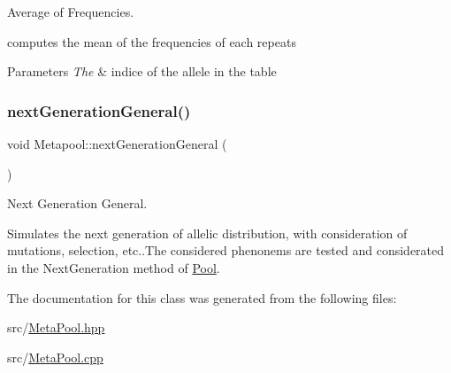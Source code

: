 Average of Frequencies. 

computes the mean of the frequencies of each repeats 
\begin{DoxyParams}{Parameters}
{\em The} & indice of the allele in the table \\
\hline
\end{DoxyParams}
\hypertarget{class_metapool_aff52cdb3a0fbdca26b966213aaf3577b}{}\label{class_metapool_aff52cdb3a0fbdca26b966213aaf3577b} 
\subsubsection{\texorpdfstring{next\+Generation\+General()}{nextGenerationGeneral()}}
{\footnotesize\ttfamily void Metapool\+::next\+Generation\+General (\begin{DoxyParamCaption}{ }\end{DoxyParamCaption})}



Next Generation General. 

Simulates the next generation of allelic distribution, with consideration of mutations, selection, etc..The considered phenonems are tested and considerated in the Next\+Generation method of \hyperlink{class_pool}{Pool}. 

The documentation for this class was generated from the following files\+:\begin{DoxyCompactItemize}
\item 
src/\hyperlink{_meta_pool_8hpp}{Meta\+Pool.\+hpp}\item 
src/\hyperlink{_meta_pool_8cpp}{Meta\+Pool.\+cpp}\end{DoxyCompactItemize}
